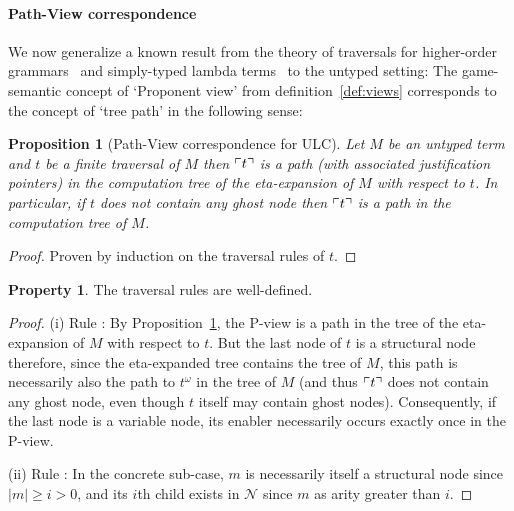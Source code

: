 \documentclass{article}
\theoremstyle{plain}
\newtheorem{proposition}[theorem]{Proposition}
\theoremstyle{definition}
\newtheorem{property}{Property}[section]
\theoremstyle{remark}
\newcommand\Nodes{\mathcal{N}}%
\begin{document}
\paragraph{Path-View correspondence}
We now generalize a known result from the theory of traversals for higher-order grammars~\cite{Ong2006} and simply-typed lambda terms~\cite[Proposition 4.29]{BlumPhd} to the untyped setting: The game-semantic concept of `Proponent view' from definition~\ref{def:views} corresponds to the concept of `tree path' in the following sense:

\begin{proposition}[Path-View correspondence for ULC]
\label{prop:pathview_ulc}
Let $M$ be an untyped term and $t$ be a \emph{finite} traversal of $M$ then
$\ulcorner t \urcorner$ is a path (with associated justification pointers) in the computation tree of the eta-expansion of $M$ with respect to $t$.
In particular, if $t$ does not contain any ghost node then $\ulcorner t \urcorner$ is a path in the computation tree of $M$.
\end{proposition}
\begin{proof}
Proven by induction on the traversal rules of $t$.
\end{proof}

\begin{property}
The traversal rules are well-defined.
\end{property}
\begin{proof}
(i) Rule : By Proposition~\ref{prop:pathview_ulc}, the P-view is a path in the tree of the eta-expansion of $M$ with respect to $t$. But the last node of $t$ is a structural node therefore, since the eta-expanded tree contains the tree of $M$, this path is necessarily also the path to $t^\omega$ in the tree of $M$ (and thus $\ulcorner t \urcorner$ does not contain any ghost node, even though $t$ itself may contain ghost nodes).
 Consequently, if the last node is a variable node, its enabler necessarily occurs exactly once in the P-view.

(ii) Rule : In the concrete sub-case, $m$ is necessarily itself a structural node since $|m|\geq i>0$, and its $i$th child exists in $\Nodes$ since $m$ as arity greater than $i$.
\end{proof}
\end{document}
